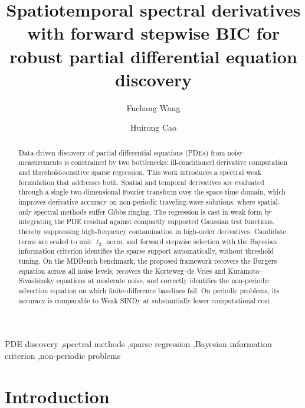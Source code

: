 \documentclass[preprint,12pt]{elsarticle}
\begin{document}
\begin{frontmatter}

\title{Spatiotemporal spectral derivatives with forward stepwise BIC for robust partial differential equation discovery}

\author[1]{Fuchang Wang}
\author[2]{Huirong Cao}

\address[1]{School of Science, Emergency Management University, No. 465 College Road, Sanhe, Hebei 065201, China}
\address[2]{School of Science, Langfang Normal University, No. 100 Ai-min Road, Langfang, Hebei 065000, China}


\begin{abstract}
Data-driven discovery of partial differential equations (PDEs) from noisy measurements is constrained by two bottlenecks: ill-conditioned derivative computation and threshold-sensitive sparse regression. This work introduces a spectral weak formulation that addresses both. Spatial and temporal derivatives are evaluated through a single two-dimensional Fourier transform over the space-time domain, which improves derivative accuracy on non-periodic traveling-wave solutions, where spatial-only spectral methods suffer Gibbs ringing. The regression is cast in weak form by integrating the PDE residual against compactly supported Gaussian test functions, thereby suppressing high-frequency contamination in high-order derivatives. Candidate terms are scaled to unit $\ell_2$ norm, and forward stepwise selection with the Bayesian information criterion identifies the sparse support automatically, without threshold tuning. On the MDBench benchmark, the proposed framework recovers the Burgers equation across all noise levels, recovers the Korteweg--de Vries and Kuramoto--Sivashinsky equations at moderate noise, and correctly identifies the non-periodic advection equation on which finite-difference baselines fail. On periodic problems, its accuracy is comparable to Weak SINDy at substantially lower computational cost.
\end{abstract}

\begin{keyword}
PDE discovery \sep spectral methods \sep sparse regression \sep Bayesian information criterion \sep non-periodic problems
\end{keyword}

\end{frontmatter}

\section{Introduction}
\label{sec:intro}
\end{document}
